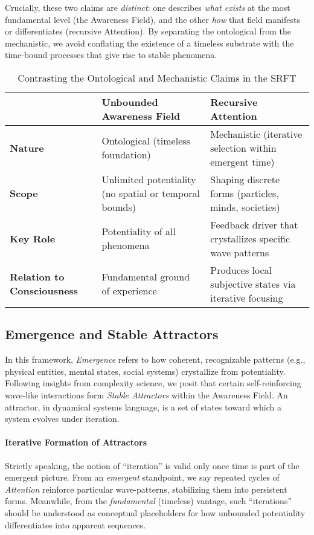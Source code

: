 \documentclass[12pt,a4paper]{article}
\begin{document}
\noindent
Crucially, these two claims are \emph{distinct}: one describes \emph{what exists} at the most fundamental level (the Awareness Field), and the other \emph{how} that field manifests or differentiates (recursive Attention). By separating the ontological from the mechanistic, we avoid conflating the existence of a timeless substrate with the time-bound processes that give rise to stable phenomena.



\begin{table}[ht]
\centering
\caption{Contrasting the Ontological and Mechanistic Claims in the SRFT}
\label{tab:ontology-mechanism}
\begin{tabular}{p{3.2cm} p{5cm} p{5cm}}
\hline
 & \textbf{Unbounded Awareness Field} 
 & \textbf{Recursive Attention} \\ \hline
\textbf{Nature} 
 & Ontological (timeless foundation) 
 & Mechanistic (iterative selection within emergent time) \\
\textbf{Scope} 
 & Unlimited potentiality \newline (no spatial or temporal bounds)
 & Shaping discrete forms (particles, minds, societies) \\
\textbf{Key Role} 
 & Potentiality of all phenomena 
 & Feedback driver that crystallizes specific wave patterns \\
\textbf{Relation to Consciousness} 
 & Fundamental ground of experience 
 & Produces local subjective states via iterative focusing \\
\hline
\end{tabular}
\end{table}


\subsection{Emergence and Stable Attractors}
\label{subsubsec:emergence-attractors}

In this framework, \emph{Emergence} refers to how coherent, recognizable patterns (e.g., physical entities, mental states, social systems) crystallize from potentiality. Following insights from complexity science, we posit that certain self-reinforcing wave-like interactions form \emph{Stable Attractors} within the Awareness Field. An attractor, in dynamical systems language, is a set of states toward which a system evolves under iteration.

\paragraph{Iterative Formation of Attractors}
Strictly speaking, the notion of ``iteration'' is valid only once time is part of the emergent picture. From an \emph{emergent} standpoint, we say repeated cycles of \emph{Attention} reinforce particular wave-patterns, stabilizing them into persistent forms. Meanwhile, from the \emph{fundamental} (timeless) vantage, such ``iterations'' should be understood as conceptual placeholders for how unbounded potentiality differentiates into apparent sequences.
\end{document}

